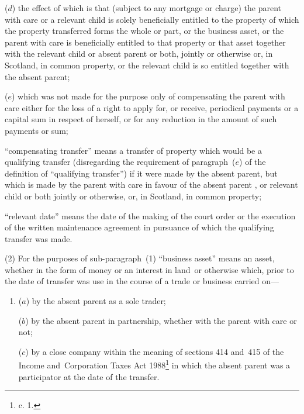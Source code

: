\documentclass[12pt,a4paper]{article}
\begin{document}
\begin{enumerate}
\begin{enumerate}
($d$) the effect of which is that (subject to any mortgage or charge) the parent with care or a relevant child is solely beneficially entitled to the property of which the property transferred forms the whole or part, or the business asset, or the parent with care is beneficially entitled to that property or that asset together with the relevant child or absent parent or both, jointly or otherwise or, in Scotland, in common property, or the relevant child is so entitled together with the absent parent;


($e$) which was not made for the purpose only of compensating the parent with care either for the loss of a right to apply for, or receive, periodical payments or a capital sum in respect of herself, or for any reduction in the amount of such payments or sum;
\end{enumerate}

“compensating transfer” means a transfer of property which would be a qualifying transfer (disregarding the requirement of paragraph~($e$) of the definition of “qualifying transfer”) if it were made by the absent parent, but which is made by the parent with care in favour of the absent parent%
, or  %
relevant child
or both jointly or otherwise, or, in Scotland, in common property;  %

“relevant date” means the date of the making of the court order or the execution of the written maintenance agreement in pursuance of which the qualifying transfer was made.
\end{enumerate}

(2) For the purposes of sub-paragraph~(1) “business asset” means an asset, whether in the form of money or an interest in land~or otherwise which, prior to the date of transfer was use in the course of a trade or business carried on—
\begin{enumerate}\item[]
($a$) by the absent parent as a sole trader;

($b$) by the absent parent in partnership, whether with the parent with care or not;

($c$) by a close company within the meaning of sections 414 and~415 of the Income and~Corporation Taxes Act 1988\footnote{ c. 1.} in which the absent parent was a participator at the date of the transfer.
\end{enumerate}
\end{document}

